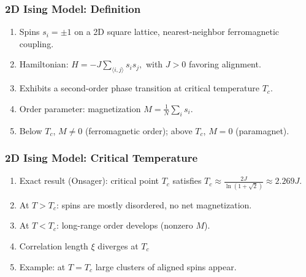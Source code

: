 \documentclass{beamer}
\begin{document}
\begin{frame}
\frametitle{2D Ising Model: Definition}

\begin{enumerate}
\item Spins $s_i = \pm 1$ on a 2D square lattice, nearest-neighbor ferromagnetic coupling.

\item Hamiltonian: $H = -J \sum_{\langle i,j\rangle} s_i s_j,$ with $J>0$ favoring alignment.

\item Exhibits a second-order phase transition at critical temperature $T_c$.

\item Order parameter: magnetization $M = \frac{1}{N}\sum_i s_i$.

\item Below $T_c$, $M\neq0$ (ferromagnetic order); above $T_c$, $M=0$ (paramagnet).
\end{enumerate}

\noindent
\end{frame}

\begin{frame}
\frametitle{2D Ising Model: Critical Temperature}

\begin{enumerate}
\item Exact result (Onsager): critical point $T_c$ satisfies $T_c \approx \frac{2J}{\ln(1+\sqrt{2})}\approx 2.269J$.

\item At $T>T_c$: spins are mostly disordered, no net magnetization.

\item At $T<T_c$: long-range order develops (nonzero $M$).

\item Correlation length $\xi$ diverges at $T_c$ 

\item Example: at $T=T_c$ large clusters of aligned spins appear.
\end{enumerate}

\noindent
\end{frame}
\end{document}
